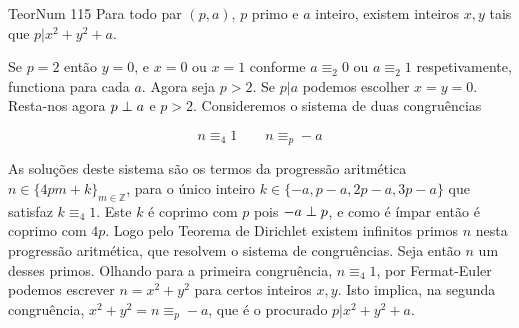 \documentclass[main.tex]{subfiles}
\begin{document}
\begin{problem}{TeorNum 115}
Para todo par $(p,a)$, $p$ primo e $a$ inteiro, existem inteiros $x,y$
tais que $p|x^2+y^2+a$.
\end{problem}

\begin{solution}
Se $p=2$ então $y=0$, e $x=0$ ou $x=1$ conforme $a\equiv_2 0$ ou $a\equiv_2 1$
respetivamente, functiona para cada $a$. Agora seja $p>2$.
Se $p|a$ podemos escolher $x=y=0$.
Resta-nos agora $p\perp a$ e $p>2$.
Consideremos o sistema de duas congruências

\begin{equation*}
n\equiv_4 1 \qquad n\equiv_p -a
\end{equation*}

As soluções deste sistema são os termos da progressão aritmética
$n\in\{4pm+k\}_{m\in\mathbb{Z}}$, para o único inteiro
$k\in\{-a,p-a,2p-a,3p-a\}$ que satisfaz $k\equiv_4 1$.
Este $k$ é coprimo com $p$ pois $-a\perp p$, e como é ímpar
então é coprimo com $4p$.
Logo pelo Teorema de Dirichlet existem infinitos primos $n$
nesta progressão aritmética, que resolvem o sistema de congruências.
Seja então $n$ um desses primos.
Olhando para a primeira congruência, $n\equiv_4 1$, por Fermat-Euler
podemos escrever $n=x^2+y^2$ para certos inteiros $x,y$.
Isto implica, na segunda congruência, $x^2+y^2=n\equiv_p -a$,
que é o procurado $p|x^2+y^2+a$.
\end{solution}
\end{document}
